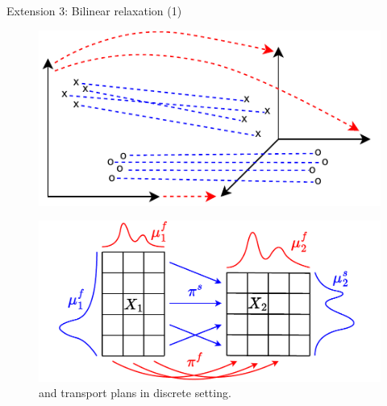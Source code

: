 \documentclass{beamer}
\begin{document}
\begin{frame}{Extension 3: Bilinear relaxation (1)}
  \begin{figure}
    \centering
    \includegraphics[width=0.7\linewidth, keepaspectratio=true]{OT_new/coot_new.pdf}
  \end{figure}

  \begin{figure}
    \centering
    \includegraphics[width=0.7\linewidth, keepaspectratio=true]{OT_new/coot_matrix_ot.pdf}
    \caption*{\scriptsize{{\color{blue}{Sample}} and {\color{red}{feature}} transport plans in discrete setting.}}
  \end{figure}
\end{frame}
\end{document}
